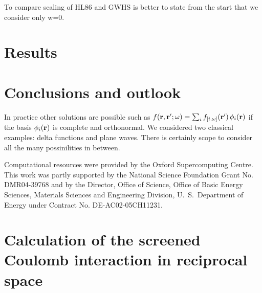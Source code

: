 \documentclass[twocolumn,prb,showpacs,superscriptaddress]{revtex4}
\def\w{\omega}
\def\r{{\bf r}}
\def\rp{{\bf r^\prime}}
\begin{document}
To compare scaling of HL86 and GWHS is better to state from the start that
we consider only w=0.

\section{Results}

\section{Conclusions and outlook}

In practice other solutions are possible such as $f(\r,\rp;\w) = \sum_i f_{[i,\w]}(\rp) \, \phi_i(\r)$
if the basis $\phi_i(\r)$ is complete and orthonormal. We considered two classical
examples: delta functions and plane waves. There is certainly scope to consider
all the many possinilities in between.

\begin{acknowledgments}
Computational resources were provided by the Oxford Supercomputing Centre.
This work was partly supported by the National Science Foundation Grant No. DMR04-39768 and by
the Director, Office of Science, Office of Basic Energy Sciences, Materials Sciences
and Engineering Division, U.\ S.\ Department of Energy under Contract No. DE-AC02-05CH11231.
\end{acknowledgments}

\appendix

\section{Calculation of the screened Coulomb interaction in reciprocal space}
\end{document}
